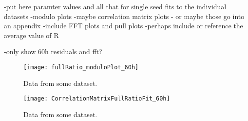 -put here paramter values and all that for single seed fits to the individual datasets
-modulo plots
-maybe correlation matrix plots - or maybe those go into an appendix
-include FFT plots and pull plots 
-perhaps include or reference the average value of R

-only show 60h residuals and fft?



\begin{figure}[]
    \centering
    \texttt{[image: fullRatio\_moduloPlot\_60h]}
    \caption[]{Data from some dataset.}
    \label{fig:}
\end{figure}


\begin{figure}[]
    \centering
    \texttt{[image: CorrelationMatrixFullRatioFit\_60h]}
    \caption[]{Data from some dataset.}
    \label{fig:}
\end{figure}


